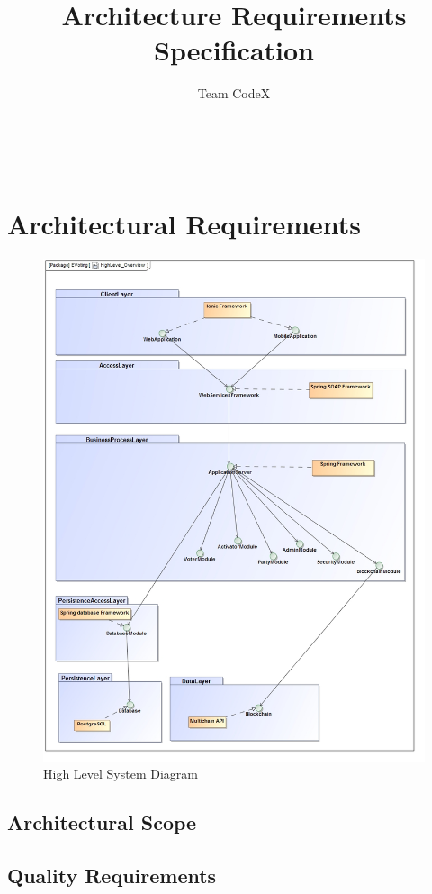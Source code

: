 \documentclass[11pt]{article}
\author{Team CodeX}
\title{Architecture Requirements Specification}
\begin{document}
	\setlength{\parskip}{6pt}
	
	
	
	\renewcommand{\thesection}{\arabic{section}}
	\newpage
	
	\tableofcontents
	
	\textsc{}\\[1cm]
	
	\newpage

	\section{Architectural Requirements}
	\begin{figure}[H]
		\centering
		\includegraphics[width=0.75\linewidth]{../Images/System/HighLevel_Overview.jpg}
		\caption{High Level System Diagram}
	\end{figure}
	
	\newpage
	
	\subsection{Architectural Scope}
		
	
	\subsection{Quality Requirements}
		
	
\end{document}
